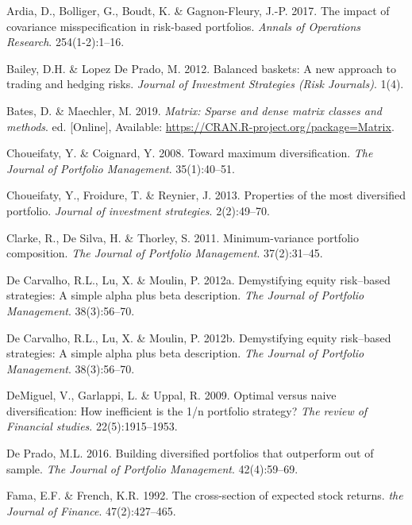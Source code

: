 \documentclass[11pt,preprint, authoryear]{elsarticle}
\numberwithin{equation}{section}
\numberwithin{figure}{section}
\numberwithin{table}{section}
\begin{document}
\hypertarget{refs}{}
\leavevmode\hypertarget{ref-ardia2017}{}%
Ardia, D., Bolliger, G., Boudt, K. \& Gagnon-Fleury, J.-P. 2017. The
impact of covariance misspecification in risk-based portfolios.
\emph{Annals of Operations Research}. 254(1-2):1--16.

\leavevmode\hypertarget{ref-lopez2012}{}%
Bailey, D.H. \& Lopez De Prado, M. 2012. Balanced baskets: A new
approach to trading and hedging risks. \emph{Journal of Investment
Strategies (Risk Journals)}. 1(4).

\leavevmode\hypertarget{ref-Matrix}{}%
Bates, D. \& Maechler, M. 2019. \emph{Matrix: Sparse and dense matrix
classes and methods}. ed. {[}Online{]}, Available:
\url{https://CRAN.R-project.org/package=Matrix}.

\leavevmode\hypertarget{ref-choueifaty2008}{}%
Choueifaty, Y. \& Coignard, Y. 2008. Toward maximum diversification.
\emph{The Journal of Portfolio Management}. 35(1):40--51.

\leavevmode\hypertarget{ref-choueifaty2013}{}%
Choueifaty, Y., Froidure, T. \& Reynier, J. 2013. Properties of the most
diversified portfolio. \emph{Journal of investment strategies}.
2(2):49--70.

\leavevmode\hypertarget{ref-clarke2011}{}%
Clarke, R., De Silva, H. \& Thorley, S. 2011. Minimum-variance portfolio
composition. \emph{The Journal of Portfolio Management}. 37(2):31--45.

\leavevmode\hypertarget{ref-leote}{}%
De Carvalho, R.L., Lu, X. \& Moulin, P. 2012a. Demystifying equity
risk--based strategies: A simple alpha plus beta description. \emph{The
Journal of Portfolio Management}. 38(3):56--70.

\leavevmode\hypertarget{ref-rawl2012}{}%
De Carvalho, R.L., Lu, X. \& Moulin, P. 2012b. Demystifying equity
risk--based strategies: A simple alpha plus beta description. \emph{The
Journal of Portfolio Management}. 38(3):56--70.

\leavevmode\hypertarget{ref-demiguel2009}{}%
DeMiguel, V., Garlappi, L. \& Uppal, R. 2009. Optimal versus naive
diversification: How inefficient is the 1/n portfolio strategy?
\emph{The review of Financial studies}. 22(5):1915--1953.

\leavevmode\hypertarget{ref-lopez}{}%
De Prado, M.L. 2016. Building diversified portfolios that outperform out
of sample. \emph{The Journal of Portfolio Management}. 42(4):59--69.

\leavevmode\hypertarget{ref-fama1992}{}%
Fama, E.F. \& French, K.R. 1992. The cross-section of expected stock
returns. \emph{the Journal of Finance}. 47(2):427--465.
\end{document}

